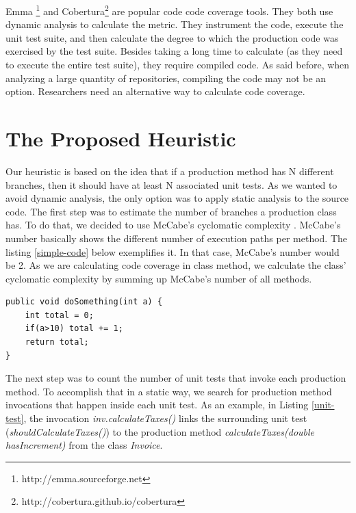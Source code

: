 \documentclass{sig-alternate}
\begin{document}
Emma \footnote{http://emma.sourceforge.net} and Cobertura\footnote{http://cobertura.github.io/cobertura} are popular 
code code coverage tools. They both use dynamic analysis to calculate the metric. They instrument the code, execute 
the unit test suite, and then calculate the degree to which the production code was exercised by the test suite. Besides 
taking a long time to calculate (as they need to execute the entire test suite),
they require compiled code. As said before, when analyzing a large quantity of repositories,
compiling the code may not be an option. Researchers need an alternative way to calculate code coverage.

\section{The Proposed Heuristic}
\label{sec-heuristic}

Our heuristic is based on the idea that if a production method has N different branches, then it should
have at least N associated unit tests. As we wanted to avoid dynamic analysis, the only option was 
to apply static analysis to the source code. The first step was to estimate the number of branches 
a production class has. To do that, we decided to use McCabe's cyclomatic complexity \cite{mccabe}.
McCabe's number basically shows the different number of execution paths per method. The listing
\ref{simple-code} below exemplifies it. In that case, McCabe's number would be 2.
As we are calculating code coverage in class method, we calculate the class' cyclomatic complexity
by summing up McCabe's number of all methods.

\begin{lstlisting}
public void doSomething(int a) {
	int total = 0;
	if(a>10) total += 1;
	return total;
}
\end{lstlisting}

The next step was to count the number of unit tests that invoke each production method. To accomplish that
in a static way, we search for production method invocations that happen inside each unit test. As an example, in Listing
\ref{unit-test}, the invocation \textit{inv.calculateTaxes()} links the surrounding unit test (\textit{shouldCalculateTaxes()}) to 
the production method \textit{calculateTaxes(double hasIncrement)} from the class \textit{Invoice}.
\end{document}
